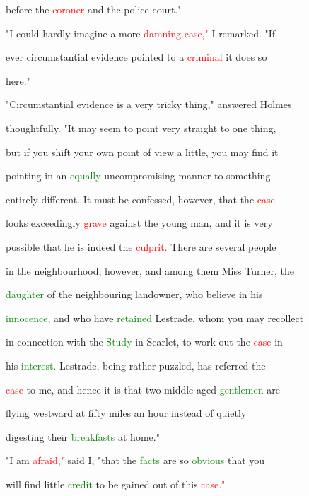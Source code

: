  before the \textcolor{red}{coroner} and the police-court."



 "I could hardly imagine a more \textcolor{red}{damning} \textcolor{red}{case,"} I remarked. "If

 ever circumstantial evidence pointed to a \textcolor{red}{criminal} it does so

 here."



 "Circumstantial evidence is a very tricky thing," answered Holmes

 thoughtfully. "It may seem to point very straight to one thing,

 but if you shift your own point of view a little, you may find it

 pointing in an \textcolor{green}{equally} uncompromising manner to something

 entirely different. It must be \textcolor{BurntOrange}{confessed,} however, that the \textcolor{red}{case}

 looks exceedingly \textcolor{red}{grave} against the \textcolor{BurntOrange}{young} man, and it is very

 possible that he is indeed the \textcolor{red}{culprit.} There are several people

 in the neighbourhood, however, and among them Miss Turner, the

 \textcolor{green}{daughter} of the neighbouring landowner, who believe in his

 \textcolor{green}{innocence,} and who have \textcolor{green}{retained} Lestrade, whom you may recollect

 in connection with the \textcolor{green}{Study} in Scarlet, to work out the \textcolor{red}{case} in

 his \textcolor{green}{interest.} Lestrade, being rather puzzled, has referred the

 \textcolor{red}{case} to me, and hence it is that two middle-aged \textcolor{green}{gentlemen} are

 flying westward at fifty miles an hour instead of quietly

 digesting their \textcolor{green}{breakfasts} at home."



 "I am \textcolor{red}{afraid,"} said I, "that the \textcolor{green}{facts} are so \textcolor{green}{obvious} that you

 will find little \textcolor{green}{credit} to be \textcolor{BurntOrange}{gained} out of this \textcolor{red}{case."}



